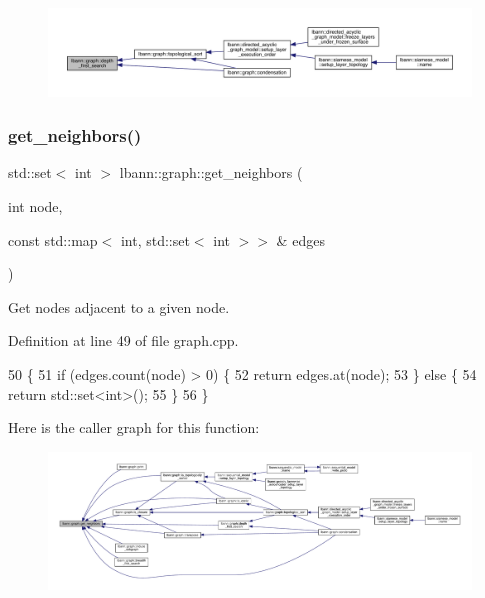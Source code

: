 \begin{figure}[H]
\begin{center}
\leavevmode
\includegraphics[width=350pt]{namespacelbann_1_1graph_a44394207f3566604f867382b10aaf974_icgraph}
\end{center}
\end{figure}
\mbox{\label{namespacelbann_1_1graph_ad305e0d104d25d9cb1e63a4b93c0847c}} 
\subsubsection{\texorpdfstring{get\+\_\+neighbors()}{get\_neighbors()}}
{\footnotesize\ttfamily std\+::set$<$ int $>$ lbann\+::graph\+::get\+\_\+neighbors (\begin{DoxyParamCaption}\item[{int}]{node,  }\item[{const std\+::map$<$ int, std\+::set$<$ int $>$$>$ \&}]{edges }\end{DoxyParamCaption})}

Get nodes adjacent to a given node. 

Definition at line 49 of file graph.\+cpp.


\begin{DoxyCode}
50                                                                   \{
51   \textcolor{keywordflow}{if} (edges.count(node) > 0) \{
52     \textcolor{keywordflow}{return} edges.at(node);
53   \} \textcolor{keywordflow}{else} \{
54     \textcolor{keywordflow}{return} std::set<int>();
55   \}
56 \}
\end{DoxyCode}
Here is the caller graph for this function\+:\nopagebreak
\begin{figure}[H]
\begin{center}
\leavevmode
\includegraphics[width=350pt]{namespacelbann_1_1graph_ad305e0d104d25d9cb1e63a4b93c0847c_icgraph}
\end{center}
\end{figure}
\mbox{\label{namespacelbann_1_1graph_a54de9f8e26046c834acfc5436a93b66b}} 
